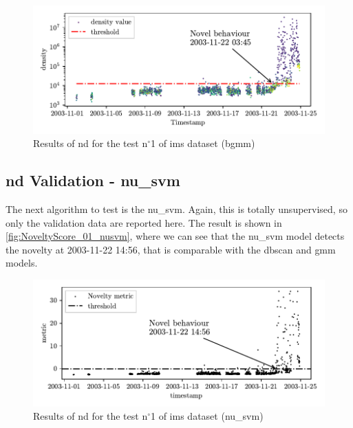 \begin{figure}
    \centering
    \includegraphics{images/IMS/Novelty_01_500samples_bearing3x_GMM_bayesan.pdf}
    \caption{Results of \gls{nd} for the test $\text{n}^\circ$1 of \gls{ims} dataset (\gls{bgmm})}
    \label{fig:NoveltyScore_01_bgmm}
\end{figure}

\subsection{\gls{nd} Validation - \gls{nu_svm}}
The next algorithm to test is the \gls{nu_svm}. Again, this is totally unsupervised, so only the validation data are reported here. The result is shown in \autoref{fig:NoveltyScore_01_nusvm}, where we can see that the \gls{nu_svm} model detects the novelty at 2003-11-22 14:56, that is comparable with the \gls{dbscan} and \gls{gmm} models.

\begin{figure}
    \centering
    \includegraphics{images/IMS/Novelty_01_500samples_bearing3x_nusvm.pdf}
    \caption{Results of \gls{nd} for the test $\text{n}^\circ$1 of \gls{ims} dataset (\gls{nu_svm})}
    \label{fig:NoveltyScore_01_nusvm}
\end{figure}

